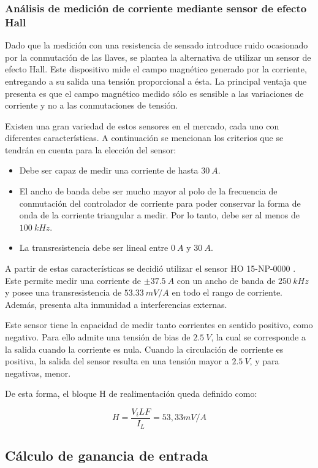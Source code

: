 \subsubsection{Análisis de medición de corriente mediante sensor de efecto Hall}

Dado que la medición con una resistencia de sensado introduce ruido ocasionado por la conmutación de las llaves, se plantea la alternativa de utilizar un sensor de efecto Hall. Este dispositivo mide el campo magnético generado por la corriente, entregando a su salida una tensión proporcional a ésta. La principal ventaja que presenta es que el campo magnético medido sólo es sensible a las variaciones de corriente y no a las conmutaciones de tensión.

Existen una gran variedad de estos sensores en el mercado, cada uno con diferentes características. A continuación se mencionan los criterios que se tendrán en cuenta para la elección del sensor:

\begin{itemize}
	\item Debe ser capaz de medir una corriente de hasta $30\:A$.
	\item El ancho de banda debe ser mucho mayor al polo de la frecuencia de conmutación del controlador de corriente para poder conservar la forma de onda de la corriente triangular a medir. Por lo tanto, debe ser al menos de $100\:kHz$.
	\item La transresistencia debe ser lineal entre $0\:A$ y $30\:A$.	
\end{itemize}

A partir de estas características se decidió utilizar el sensor HO 15-NP-0000 \cite{HO15-NP}. Este permite medir una corriente de $\pm 37.5\:A$ con un ancho de banda de $250\:kHz$ y posee una transresistencia de $53.33\:mV/A$ en todo  el rango de corriente. Además, presenta alta inmunidad a interferencias externas. 

Este sensor tiene la capacidad de medir tanto corrientes en sentido positivo, como negativo. Para ello admite una tensión de bias de $2.5\:V$, la cual se corresponde a la salida cuando la corriente es nula. Cuando la circulación de corriente es positiva, la salida del sensor resulta en una tensión mayor a $2.5\:V$, y para negativas, menor.

De esta forma, el bloque H de realimentación queda definido como:

\begin{equation}
	H=\frac{V_iLF}{I_L}=53,33 mV/A
\end{equation}



\subsection{Cálculo de ganancia de entrada}


